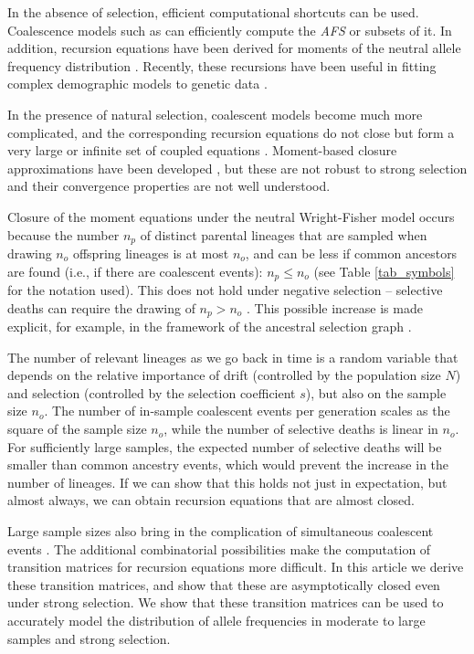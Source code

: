\documentclass[review]{elsarticle}
\begin{document}
In the absence of selection, efficient computational shortcuts can be used. Coalescence models such
as \citep{fastsimcoal2, KammEtAl2017} can efficiently compute the \textit{AFS} or subsets of it. In
addition, recursion equations have been derived for moments of the neutral allele frequency
distribution \citep{KimuraCrow1964,Ewens1972,JouganousEtAl2017}. Recently, these recursions have
been useful in fitting complex demographic models to genetic data
\citep{JouganousEtAl2017,KammEtAl2017}.
 
In the presence of natural selection, coalescent models become much more complicated, and the
corresponding recursion equations do not close but
form a very large or infinite set of coupled equations \citep{DonnellyKurtz1999, JouganousEtAl2017}. Moment-based closure approximations
have been developed \citep{JouganousEtAl2017}, but these are not robust to strong selection and
their convergence properties are not well understood.

Closure of the moment equations under the neutral Wright-Fisher model occurs because the number $n_p$ of
distinct parental lineages that are sampled when drawing $n_o$ offspring lineages is at most $n_o$, and can be less if common ancestors are found (i.e., if there are coalescent events): 
$n_p \le n_o$ (see Table \ref{tab_symbols} for the notation used). This does not
hold under negative selection -- selective deaths can require the drawing of $n_p>n_o$  \citep{DonnellyKurtz1999a,
  JouganousEtAl2017}. This possible increase is made explicit, for example, in the framework of the ancestral
selection graph \citep{KroneNeuhauser1997}.

The number of relevant lineages as we go back in time is a random variable that depends on the relative
importance of drift (controlled by the population size $N$) and selection (controlled by the selection coefficient $s$), but also on the sample size $n_o$. 
The number of in-sample coalescent events per generation scales as the square of the sample size $n_o$,
while the number of selective deaths is linear in $n_o$. For sufficiently large
samples, the expected number of selective deaths will be smaller than common ancestry events, which would prevent the
increase in the number of lineages. If we can show that this holds not just in expectation, but almost always,  
we can obtain recursion equations that are almost closed. 
 
Large sample sizes also bring in the complication of simultaneous coalescent events
\citep{BhaskarEtAl2014}. The additional combinatorial possibilities make the computation 
of transition matrices for recursion equations more difficult. 
In this article we derive these transition matrices, and
show that these are asymptotically closed even under strong selection. %
We show that these transition matrices can be used to accurately model the 
distribution of allele frequencies in moderate to large samples and strong selection.
\end{document}
